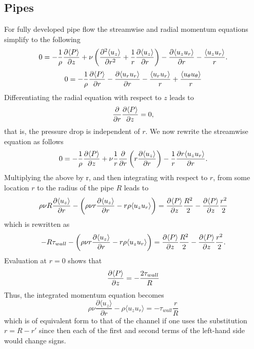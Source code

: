 \documentclass[oneside,a4paper,11pt]{report}
\begin{document}
\subsection{Pipes}

For fully developed pipe flow the streamwise and radial momentum equations simplify to the following
\begin{equation}
0 =  -\frac{1}{\rho} \frac{\partial \langle P \rangle}{\partial z} + \nu \left ( \frac{\partial^2 \langle u_z \rangle}{\partial r^2} + \frac{1}{r} \frac{\partial \langle u_z \rangle}{\partial r} \right ) - \frac{\partial \langle u_z u_r \rangle}{\partial r} - \frac{\langle u_z u_r \rangle}{r}.
\end{equation}
\begin{equation}
0 = -\frac{1}{\rho} \frac{\partial \langle P \rangle}{\partial r} - \frac{\partial \langle u_ru_r \rangle}{\partial r} - \frac{\langle u_ru_r \rangle}{r} + \frac{\langle u_\theta u_\theta \rangle}{r}
\end{equation} 
Differentiating the radial equation with respect to $z$ leads to
\begin{equation}
\frac{\partial}{\partial r} \frac{\partial \langle P \rangle}{\partial z} = 0,
\end{equation}
that is, the pressure drop is independent of $r$. 
We now rewrite the streamwise equation as follows
\begin{equation}
0 =  -\frac{1}{\rho} \frac{\partial \langle P \rangle}{\partial z} + \nu \frac{1}{r} \frac{\partial}{\partial r} \left (r \frac{\partial \langle u_z \rangle}{\partial r} \right ) - \frac{1}{r} \frac{\partial r \langle u_z u_r \rangle}{\partial r}.
\end{equation}
Multiplying the above by r, and then integrating with respect to $r$, from some location $r$ to the radius of the pipe $R$ leads to
\begin{equation}
\rho \nu R \frac{\partial \langle u_z \rangle}{\partial r} - \left ( \rho \nu r \frac{\partial \langle u_z \rangle}{\partial r} - r \rho \langle u_z u_r \rangle \right )= \frac{\partial \langle P \rangle}{\partial z} \frac{R^2}{2} - \frac{\partial \langle P \rangle}{\partial z} \frac{r^2}{2}
\end{equation}
which is rewritten as
\begin{equation}
-R \tau_{wall} - \left ( \rho \nu r \frac{\partial \langle u_z \rangle}{\partial r} - r \rho \langle u_z u_r \rangle \right )= \frac{\partial \langle P \rangle}{\partial z} \frac{R^2}{2} - \frac{\partial \langle P \rangle}{\partial z} \frac{r^2}{2}.
\end{equation}
Evaluation at $r = 0$ shows that
\begin{equation}
\frac{\partial \langle P \rangle}{\partial z} = -\frac{2\tau_{wall}}{R}
\end{equation}
Thus, the integrated momentum equation becomes
\begin{equation}
\rho \nu \frac{\partial \langle u_z \rangle}{\partial r} - \rho \langle u_z u_r \rangle = -\tau_{wall} \frac{r}{R}
\end{equation}
which is of equivalent form to that of the channel if one uses the substitution $r = R - r'$ since then each of the first and second terms of the left-hand side would change signs. 
\end{document}
